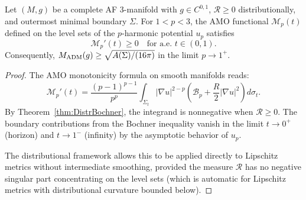 \begin{corollary}\label{cor:AMOLipschitz}
Let $(M, g)$ be a complete AF 3-manifold with $g \in C^{0,1}$, $\mathcal{R} \ge 0$ distributionally, and outermost minimal boundary $\Sigma$. For $1 < p < 3$, the AMO functional $\mathcal{M}_p(t)$ defined on the level sets of the $p$-harmonic potential $u_p$ satisfies
\begin{equation}
    \mathcal{M}_p'(t) \ge 0 \quad \text{for a.e. } t \in (0, 1).
\end{equation}
Consequently, $M_{\mathrm{ADM}}(g) \ge \sqrt{A(\Sigma)/(16\pi)}$ in the limit $p \to 1^+$.
\end{corollary}

\begin{proof}
The AMO monotonicity formula on smooth manifolds reads:
\begin{equation}
    \mathcal{M}_p'(t) = \frac{(p-1)^{p-1}}{p^p} \int_{\Sigma_t} |\nabla u|^{2-p} \left( \mathcal{B}_p + \frac{R}{2} |\nabla u|^2 \right) d\sigma_t.
\end{equation}
By Theorem~\ref{thm:DistrBochner}, the integrand is nonnegative when $\mathcal{R} \ge 0$. The boundary contributions from the Bochner inequality vanish in the limit $t \to 0^+$ (horizon) and $t \to 1^-$ (infinity) by the asymptotic behavior of $u_p$.

The distributional framework allows this to be applied directly to Lipschitz metrics without intermediate smoothing, provided the measure $\mathcal{R}$ has no negative singular part concentrating on the level sets (which is automatic for Lipschitz metrics with distributional curvature bounded below).
\end{proof}


